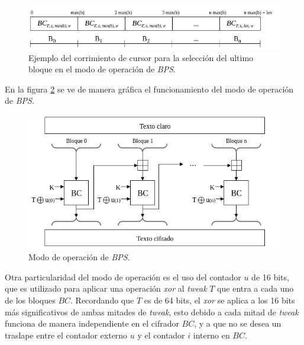 \begin{figure}[H]
  \begin{center}
    \includegraphics[width=0.8\linewidth]
    {../../../../../diagramas_comunes/bps/cursor_bps}
    \caption{Ejemplo del corrimiento de cursor para la selección del ultimo
      bloque en el modo de operación de \textit{BPS}.}
    \label{cursor_BPS}
   \end{center}
\end{figure}

En la figura \ref{modo_de_operacion_BPS} se ve de manera gráfica el
funcionamiento del modo de operación de \textit{BPS}.

\begin{figure}[H]
  \begin{center}
    \includegraphics[width=0.85\linewidth]
    {../../../../../diagramas_comunes/bps/modo_de_operacion_bps}
    \caption{Modo de operación de \textit{BPS}.}
    \label{modo_de_operacion_BPS}
   \end{center}
\end{figure}

Otra particularidad del modo de operación es el uso del contador $u$ de 16
bits, que es utilizado para aplicar una operación \textit{xor} al
\textit{tweak} $T$ que entra a cada uno de los bloques $BC$. Recordando que $T$
es de 64 bits, el \textit{xor} se aplica a los 16 bits más significativos de
ambas mitades de \textit{tweak}, esto debido a cada mitad de \textit{tweak}
funciona de manera independiente en el cifrador $BC$, y a que no se desea un
traslape entre el contador externo $u$ y el contador $i$ interno en $BC$.


